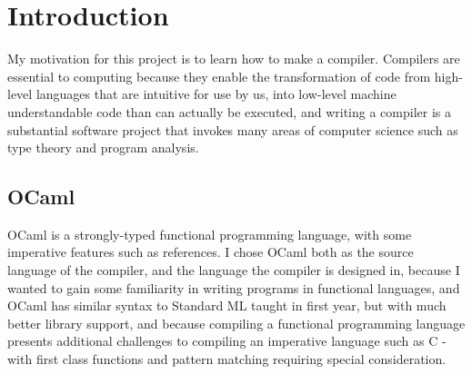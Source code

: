 \documentclass[12pt,twoside,notitlepage]{report}
\newcommand{\cfbox}[2]{%
	\colorlet{currentcolor}{.}%
	{\color{#1}%
		\fbox{\color{currentcolor}#2}}%
}
\newcommand\note[1]{\noindent\cfbox{blue}{\parbox{\textwidth}{\textcolor{blue}{#1}}}}
\begin{document}
\chapter{Introduction}
\note{The Introduction should explain the principal motivation for the project. Show how the work fits into the broad area of surrounding Computer Science and give a brief survey of previous related work. It should generally be unnecessary to quote at length from technical papers or textbooks. If a simple bibliographic reference is insufficient, consign any lengthy quotation to an appendix.}
My motivation for this project is to learn how to make a compiler. Compilers are essential to computing because they enable the transformation of code from high-level languages that are intuitive for use by us, into low-level machine understandable code than can actually be executed, and writing a compiler is a substantial software project that invokes many areas of computer science such as type theory and program analysis.


\section{OCaml}
OCaml\cite{OCaml} is a strongly-typed functional programming language, with some imperative features such as references. I chose OCaml both as the source language of the compiler, and the language the compiler is designed in, because I wanted to gain some familiarity in writing programs in functional languages, and OCaml has similar syntax to Standard ML taught in first year, but with much better library support, and because compiling a functional programming language presents additional challenges to compiling an imperative language such as C - with first class functions and pattern matching requiring special consideration.
\end{document}
